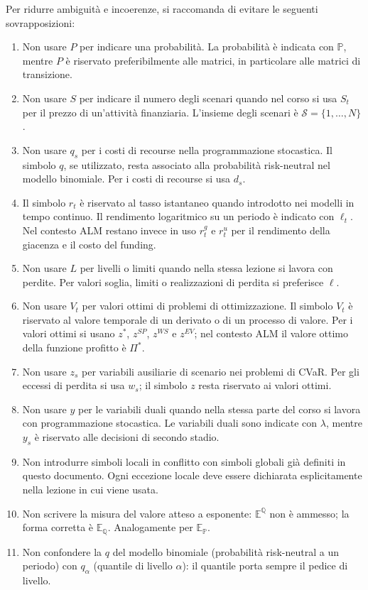 \documentclass[12pt,a4paper]{article}
\newcommand{\E}{\mathbb{E}}
\newcommand{\Prob}{\mathbb{P}}
\newcommand{\Q}{\mathbb{Q}}
\newcommand{\1}{\mathbf{1}}
\begin{document}
Per ridurre ambiguit\`a e incoerenze, si raccomanda di evitare le seguenti
sovrapposizioni:

\begin{enumerate}
\item Non usare $P$ per indicare una probabilit\`a. La probabilit\`a \`e
indicata con $\Prob$, mentre $P$ \`e riservato preferibilmente alle matrici,
in particolare alle matrici di transizione.

\item Non usare $S$ per indicare il numero degli scenari quando nel corso si
usa $S_t$ per il prezzo di un'attivit\`a finanziaria. L'insieme degli scenari
\`e $\mathcal S=\{1,\ldots,N\}$.

\item Non usare $q_s$ per i costi di recourse nella programmazione stocastica.
Il simbolo $q$, se utilizzato, resta associato alla probabilit\`a
risk-neutral nel modello binomiale. Per i costi di recourse si usa $d_s$.

\item Il simbolo $r_t$ \`e riservato al tasso istantaneo quando introdotto
nei modelli in tempo continuo. Il rendimento logaritmico su un periodo \`e
indicato con $\ell_t$. Nel contesto ALM restano invece in uso
$r_t^{g}$ e $r_t^{u}$ per il rendimento della giacenza e il costo del funding.

\item Non usare $L$ per livelli o limiti quando nella stessa lezione si lavora
con perdite. Per valori soglia, limiti o realizzazioni di perdita si preferisce
$\ell$.

\item Non usare $V_t$ per valori ottimi di problemi di ottimizzazione. Il
simbolo $V_t$ \`e riservato al valore temporale di un derivato o di un
processo di valore. Per i valori ottimi si usano $z^*$, $z^{SP}$, $z^{WS}$ e $z^{EV}$;
nel contesto ALM il valore ottimo della funzione profitto \`e $\Pi^{*}$.

\item Non usare $z_s$ per variabili ausiliarie di scenario nei problemi di CVaR.
Per gli eccessi di perdita si usa $w_s$; il simbolo $z$ resta riservato ai
valori ottimi.

\item Non usare $y$ per le variabili duali quando nella stessa parte del corso
si lavora con programmazione stocastica. Le variabili duali sono indicate con
$\lambda$, mentre $y_s$ \`e riservato alle decisioni di secondo stadio.

\item Non introdurre simboli locali in conflitto con simboli globali gi\`a
definiti in questo documento. Ogni eccezione locale deve essere dichiarata
esplicitamente nella lezione in cui viene usata.

\item Non scrivere la misura del valore atteso a esponente: $\E^{\Q}$ non
\`e ammesso; la forma corretta \`e $\E_{\Q}$. Analogamente per
$\E_{\Prob}$.

\item Non confondere la $q$ del modello binomiale (probabilit\`a
risk-neutral a un periodo) con $q_{\alpha}$ (quantile di livello
$\alpha$): il quantile porta sempre il pedice di livello.
\end{enumerate}
\end{document}
